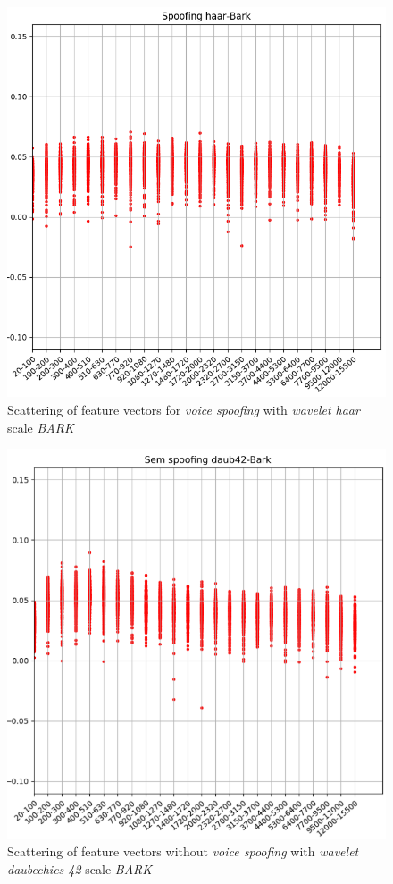 		\begin{figure}[!h]
			\centering
			\includegraphics[width=.70\linewidth, height=.68\linewidth]{images/results/barkVersusMel/spoofingHaarBark}
			\caption{Scattering of feature vectors for \textit{voice spoofing} with \textit{wavelet haar} scale \textit{BARK}}
			\label{fig:spoofinghaarbark}
		\end{figure}
		
		\begin{figure}[!h]
			\centering
			\includegraphics[width=.70\linewidth, height=.68\linewidth]{images/results/barkVersusMel/liveDaub42Bark}
			\caption{Scattering of feature vectors without \textit{voice spoofing} with \textit{wavelet daubechies 42} scale \textit{BARK}}
			\label{fig:livedaub42bark}
		\end{figure}
		
